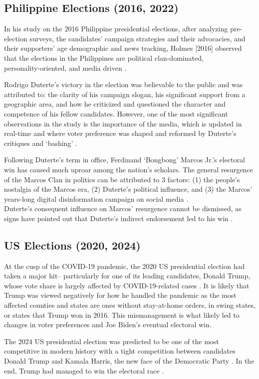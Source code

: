 \subsection{Philippine Elections (2016, 2022)}
In his study on the 2016 Philippine presidential elections, after analyzing pre-election surveys, the candidates' campaign strategies and their advocacies, and their supporters' age demographic and news tracking, Holmes [2016] observed that the elections in the Philippines are political clan-dominated, \\personality-oriented, and media driven \cite{RRL_Holmes-2016}.

Rodrigo Duterte's victory in the election was believable to the public and was attributed to: the clarity of his campaign slogan, his significant support from a geographic area, and how he criticized and questioned the character and competence of his fellow candidates. However, one of the most significant observations in the study is the importance of the media, which is updated in real-time and where voter preference was shaped and reformed by Duterte’s critiques and ‘bashing’ \cite{RRL_Holmes-2016}.

Following Duterte’s term in office, Ferdinand ‘Bongbong’ Marcos Jr.’s electoral win has caused much uproar among the nation’s scholars. The general resurgence of the Marcos Clan in politics can be attributed to 3 factors: (1) the people’s nostalgia of the Marcos era, (2) Duterte’s political influence, and (3) the Marcos’ years-long digital disinformation campaign on social media \cite{RRL_Pernia-2025}. \\Duterte’s consequent influence on Marcos’ resurgence cannot be dismissed, as signs have pointed out that Duterte’s indirect endorsement led to his win \cite{RRL_Dulay-2023}.

\subsection{US Elections (2020, 2024)}
At the cusp of the COVID-19 pandemic, the 2020 US presidential election had taken a major hit– particularly for one of its leading candidates, Donald Trump, whose vote share is largely affected by COVID-19-related cases \cite{RRL_Baccini-2021}. It is likely that Trump was viewed negatively for how he handled the pandemic as the most affected counties and states are ones without stay-at-home orders, in swing states, or states that Trump won in 2016. This mismanagement is what likely led to changes in voter preferences and Joe Biden’s eventual electoral win.

The 2024 US presidential election was predicted to be one of the most competitive in modern history with a tight competition between candidates Donald Trump and Kamala Harris, the new face of the Democratic Party \cite{RRL_Setiawan-2025}. In the end, Trump had managed to win the electoral race \cite{RRL_Setiawan-2025}.